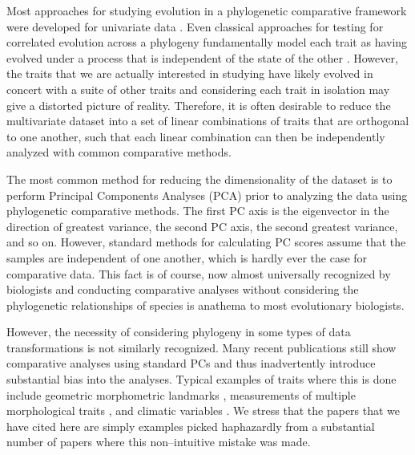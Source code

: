 \documentclass[a4paper,12pt]{article}
\begin{document}
Most approaches for studying evolution in a phylogenetic comparative framework were developed for univariate data \citep[reviewed in][]{PennellHarmon}. Even classical approaches for testing for correlated evolution across a phylogeny \citep[e.g.,][]{Felsenstein1985, Grafen1989, HarveyPagel1991} fundamentally model each trait as having evolved under a process that is independent of the state of the other \citep{HansenOrzack2005}. However, the traits that we are actually interested in studying have likely evolved in concert with a suite of other traits and considering each trait in isolation may give a distorted picture of reality. Therefore, it is often desirable to reduce the multivariate dataset into a set of linear combinations of traits that are orthogonal to one another, such that each linear combination can then be independently analyzed with common comparative methods.

The most common method for reducing the dimensionality of the dataset is to perform Principal Components Analyses (PCA) prior to analyzing the data using phylogenetic comparative methods. The first PC axis is the eigenvector in the direction of greatest variance, the second PC axis, the second greatest variance, and so on. However, standard methods for calculating PC scores assume that the samples are independent of one another, which is hardly ever the case for comparative data. This fact is of course, now almost universally recognized by biologists and conducting comparative analyses without considering the phylogenetic relationships of species is anathema to most evolutionary biologists.

However, the necessity of considering phylogeny in some types of data transformations \citep{Revell2008} is not similarly recognized. Many recent publications still show comparative analyses using standard PCs and thus inadvertently introduce substantial bias into the analyses. Typical examples of traits where this is done include geometric morphometric landmarks \citep[e.g.,][]{Dornburg2011, Hunt2013}, measurements of multiple morphological traits \citep[e.g.,][]{Harmon2010, BergmannIrshick2012, Weir2012, Pienaar2013, Price2014}, and climatic variables \citep[e.g.,][]{KozakWiens2010, Schnitzler2012}. We stress that the papers that we have cited here are simply examples picked haphazardly from a substantial number of papers where this non--intuitive mistake was made.
\end{document}
